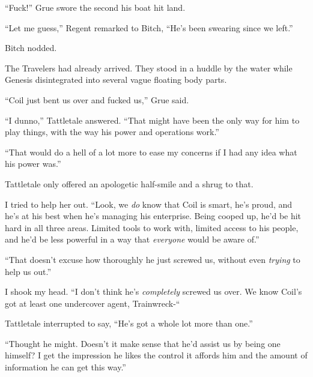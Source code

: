 





``Fuck!'' Grue swore the second his boat hit land.



``Let me guess,'' Regent remarked to Bitch, ``He's been swearing since we left.''



Bitch nodded.



The Travelers had already arrived.  They stood in a huddle by the water while Genesis disintegrated into several vague floating body parts.



``Coil just bent us over and fucked us,'' Grue said.



``I dunno,'' Tattletale answered.  ``That might have been the only way for him to play things, with the way his power and operations work.''



``That would do a hell of a lot more to ease my concerns if I had any idea what his power was.''



Tattletale only offered an apologetic half-smile and a shrug to that.



I tried to help her out.  ``Look, we \emph{do} know that Coil is smart, he's proud, and he's at his best when he's managing his enterprise.  Being cooped up, he'd be hit hard in all three areas.  Limited tools to work with, limited access to his people, and he'd be less powerful in a way that \emph{everyone} would be aware of.''



``That doesn't excuse how thoroughly he just screwed us, without even \emph{trying} to help us out.''



I shook my head. ``I don't think he's \emph{completely }screwed us over.  We know Coil's got at least one undercover agent, Trainwreck-``



Tattletale interrupted to say, ``He's got a whole lot more than one.''



``Thought he might.  Doesn't it make sense that he'd assist us by being one himself?  I get the impression he likes the control it affords him and the amount of information he can get this way.''



